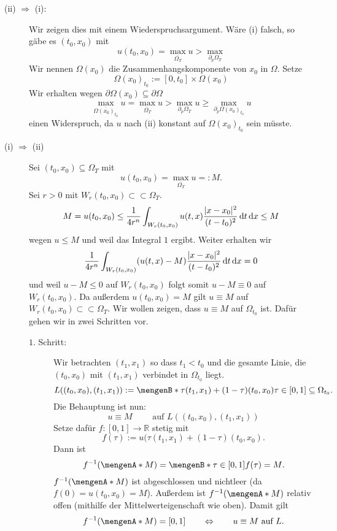 \begin{beweis}
	\begin{description}
		\item[(ii) $\Rightarrow$ (i):]Wir zeigen dies mit einem Wiederspruchsargument. Wäre (i) falsch, so gäbe es $(t_0,x_0)$ mit 
		\[
			u(t_0,x_0) = \max_{\bar{\Omega_T}} u > \max_{\partial_p \Omega_T}
		\]  
		Wir nennen $\Omega(x_0)$ die Zusammenhangskomponente von $x_0$ in $\Omega$. Setze
		\[
			\Omega(x_0)_{t_0} := [0,t_0] \times \Omega(x_0)
		\]
		Wir erhalten wegen $\partial \Omega(x_0) \subseteq  \partial \Omega$
		\[
			\max_{\overline{\Omega(x_0)_{t_0}}}u = \max_{\overline{\Omega_T}}u > \max_{\partial_p \Omega_T} u \geq \max_{\partial_p \Omega(x_0)_{t_0}}u 
		\]
		einen Widerspruch, da $u$ nach (ii) konstant auf $\Omega(x_0)_{t_0}$ sein müsste.
		\item[(i) $\Rightarrow$ (ii)] Sei $(t_0,x_0) \subseteq \Omega_T$ mit 
		\[
			u(t_0,x_0) = \max_{\overline{\Omega_T}}u =: M.
		\]
		Sei $r >0$ mit $W_r(t_0,x_0) \subset \subset \Omega_T$.
		\[
			M = u(t_0,x_0) \leq  \frac{1}{4r^n} \int_{W_r(t_0,x_0)}^{}u(t,x) \frac{\lvert x-x_0\rvert^2}{(t-t_0)^2} \,\mathrm{d}t \,\mathrm{d}x \leq M
		\]
		wegen $u \leq M$ und weil das Integral $1$ ergibt. Weiter erhalten wir
		\[
			\frac{1}{4r^n} \int_{W_r(t_0,x_0)}^{} (u(t,x)-M) \frac{\lvert x-x_0\rvert^2}{(t-t_0)^2} \,\mathrm{d}t \,\mathrm{d}x =0
		\]
		und weil $u-M \leq 0$ auf $W_r(t_0,x_0)$ folgt somit $u-M \equiv 0$ auf $W_r(t_0,x_0)$. 
		Da außerdem $u(t_0,x_0)=M$ gilt $u \equiv M$ auf $W_r(t_0,x_0) \subset \subset \Omega_T$.
		Wir wollen zeigen, dass $u \equiv M$ auf $\Omega_{t_0}$ ist. Dafür gehen wir in zwei Schritten vor.
		\begin{description}
			\item[$1$. Schritt:] Wir betrachten $(t_1,x_1)$ so dass $t_1 < t_0$ und die gesamte Linie, 
			die $(t_0,x_0)$ mit $(t_1,x_1)$ verbindet in $\Omega_{t_0}$ liegt. 
			\[
				L((t_0,x_0),(t_1,x_1)) : = \set[\tau (t_1,x_1) + (1- \tau) (t_0,x_0)]{\tau \in [0,1]} \subseteq \Omega_{t_0}.
			\]
			Die Behauptung ist nun: 
			\[
				u \equiv M \qquad \text{ auf } L((t_0,x_0),(t_1,x_1))
			\]
			Setze dafür $f : [0,1] \to \mathbb{R}$ stetig mit
			\[
				f(\tau) := u(\tau (t_1,x_1) + (1- \tau) (t_0,x_0).
			\]
			Dann ist 
			\[
				f^{-1}(\set{M}) = \set[\tau \in [0,1]]{f(\tau) = M}.
			\]
			$f^{-1}(\set{M})$ ist abgeschlossen und nichtleer (da $f(0)= u(t_0,x_0) = M$). 
			Außerdem ist $f^{-1}(\set{M})$ relativ offen (mithilfe der Mittelwerteigenschaft wie oben). Damit gilt
			\[
				f^{-1}(\set{M}) = [0,1] \qquad \Leftrightarrow \qquad u \equiv M \text{ auf } L.
\]
\end{description}
\end{description}
\end{beweis}

